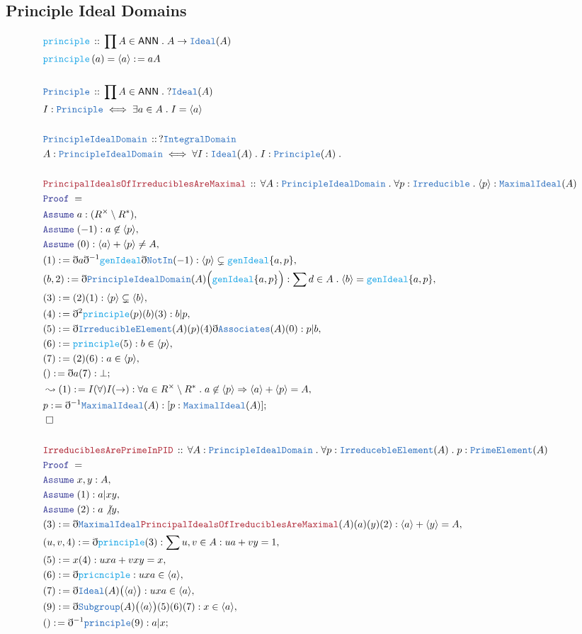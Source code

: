\documentclass[12pt]{scrartcl}
\newcommand{\TYPE}[1]{\textcolor{NavyBlue}{\mathtt{#1}}}
\newcommand{\FUNC}[1]{\textcolor{Cerulean}{\mathtt{#1}}}
\newcommand{\LOGIC}[1]{\textcolor{Blue}{\mathtt{#1}}}
\newcommand{\THM}[1]{\textcolor{Maroon}{\mathtt{#1}}}
\renewcommand{\.}{\; . \;}
\newcommand{\de}{: \kern 0.1pc =}
\newcommand{\Act}[1]{\left( #1 \right)}
\newcommand{\Theorem}[2]{& \THM{#1} \, :: \, #2 \\ & \Proof = \\ }
\newcommand{\DeclareType}[2]{& \TYPE{#1} \, :: \, #2 \\}
\newcommand{\DefineType}[3]{& #1 : \TYPE{#2} \iff #3 \\}
\newcommand{\DeclareFunc}[2]{& \FUNC{#1} \, :: \, #2 \\}
\newcommand{\DefineNamedFunc}[4]{&  \FUNC{#1}\Act{#2} = #3 \de #4 \\}
\newcommand{\Page}[1]{ \begin{align*} #1 \end{align*}   }
\newcommand{ \bd }{ \ByDef }
\newcommand{\Say}[3]{& #1 \de #2 : #3, \\}
\newcommand{\Conclude}[3]{& #1 \de #2 : #3; \\}
\newcommand{\Derive}[3]{& \leadsto #1 \de #2 : #3, \\}
\newcommand{\Assume}[2]{& \LOGIC{Assume} \; #1 : #2, \\}
\newcommand{\QED}{\; \square}
\newcommand{\EndProof}{& \QED \\}
\newcommand{\ByDef}{\eth}
\newcommand{\Proof}{\LOGIC{Proof} \; }
\newcommand{\Ideal}{\TYPE{Ideal}}
\newcommand{\ID}{\TYPE{IntegralDomain}}
\newcommand{\PID}{\TYPE{PrincipleIdealDomain}}
\newcommand{\ANN}{\mathsf{ANN}}
\begin{document}
\subsection{Principle Ideal Domains}
\Page{
	\DeclareFunc{principle}{\prod A \in \ANN \. A \to \Ideal(A)}
	\DefineNamedFunc{principle}{a}{\langle a \rangle}{aA}
	\\
	\DeclareType{Principle}{\prod A \in \ANN \. ?\Ideal(A)}
	\DefineType{I}{Principle }{\exists a \in A \. I = \langle a \rangle}
	\\
	\DeclareType{\PID}{?\ID}
	\DefineType{A}{\PID}{\forall I : \TYPE{Ideal}(A) \. I : \TYPE{Principle}(A)  \.   }     
	\\
	\Theorem{PrincipalIdealsOfIrreduciblesAreMaximal}{\forall A  : \PID \. \forall p : \TYPE{Irreducible} \. \langle p \rangle : \TYPE{MaximalIdeal}(A)   }
	\Assume{a}{(R^\times \setminus R^*)}
	\Assume{(-1)}{a \not \in \langle p \rangle}
	\Assume{(0)}{\langle a \rangle + \langle p \rangle \neq A}
	\Say{(1)}{ \bd a \bd^{-1} \FUNC{genIdeal} \bd \TYPE{NotIn}(-1)}{\langle p \rangle\subsetneq \FUNC{genIdeal}\{ a,p \} }
	\Say{(b,2)}{ \bd \PID(A)\Big(\FUNC{genIdeal}\{a,p\}\Big) }{ \sum d \in A \. \langle b\rangle = \FUNC{genIdeal}\{a,p\} }
	\Say{ (3)  }{  (2)(1)   }{ \langle p \rangle \subsetneq \langle b \rangle }
	\Say{(4)}{\bd^2 \FUNC{principle}(p)(b)(3)}{  b | p }
	\Say{(5)}{\bd \TYPE{IrreducibleElement}(A)(p)(4)\bd \TYPE{Associates}(A)(0)}{ p | b }
	\Say{(6)}{\FUNC{principle}(5)}{b \in \langle p \rangle}
	\Say{(7)}{ (2)(6) }{ a   \in \langle p \rangle }
	\Conclude{()}{\bd a (7)}{\bot}
	\Derive{(1)}{I(\forall)I(\rightarrow)}{ \forall a \in R^\times \setminus R^* \. a \not \in \langle p \rangle \Rightarrow \langle a \rangle + \langle p \rangle = A}
	\Conclude{p}{\bd^{-1}\TYPE{MaximalIdeal}(A)}{[p : \TYPE{MaximalIdeal}(A)]}
	\EndProof
	\\
	\Theorem{IrreduciblesArePrimeInPID}{ \forall A : \PID  \. \forall p : \TYPE{IrreducebleElement}(A) \. p : \TYPE{PrimeElement}(A)}
	\Assume{x,y}{A}
	\Assume{(1)}{a | xy}
	\Assume{(2)}{a \not | y}
	\Say{(3)}{ \bd \TYPE{MaximalIdeal} \THM{PrincipalIdealsOfIreduciblesAreMaximal}(A)(a)(y)(2)}{\langle  a  \rangle + \langle y \rangle = A }
	\Say{(u,v,4)}{\bd \FUNC{principle}(3)}{\sum u,v \in A : ua + vy = 1}
	\Say{(5)}{x(4)}{  uxa + vxy = x }
	\Say{(6)}{\bd \FUNC{pricnciple}}{uxa \in \langle a \rangle}
	\Say{(7)}{ \bd \TYPE{Ideal}(A)\big(\langle a \rangle\big)   }{  uxa \in \langle a \rangle  }
	\Say{(9)}{ \bd \TYPE{Subgroup}(A)\big( \langle a \rangle \big)(5)(6)(7)}{x \in \langle a \rangle}
	\Conclude{()}{\bd^{-1} \TYPE{principle}(9)}{a | x}
}
\end{document}
